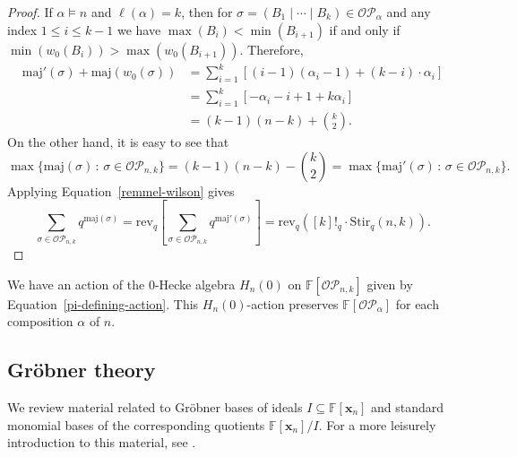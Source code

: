 \documentclass[ALCO,ThmDefs,published]{cedram}
\newcommand{\xx}{{\mathbf {x}}}
\newcommand{\FF}{{\mathbb{F}}}
\theoremstyle{plain}
\newcommand{\maj}{{\mathrm {maj}}}
\newcommand{\Stir}{{\mathrm {Stir}}}
\newcommand{\rev}{{\mathrm {rev}}}
\newcommand{\OP}{{\mathcal{OP}}}
\newcommand{\FF}{{\mathbb{F}}}
\newcommand{\xx}{{\mathbf {x}}}
\newcommand{\pib}{\overline{\pi}}
\begin{document}
\begin{proof}
If $\alpha \models n$ and $\ell(\alpha) = k$, then for $\sigma = (B_1 \mid \cdots \mid B_k) \in \OP_{\alpha}$
and any index $1 \leq i \leq k-1$ 
we have $\max(B_i) < \min(B_{i+1})$ if and only if $\min(w_0(B_i)) > \max(w_0(B_{i+1}))$.
Therefore,
\begin{align}
\maj'(\sigma) + \maj(w_0(\sigma)) &=  \sum_{i = 1}^{k} [(i-1)(\alpha_i - 1) + (k-i) \cdot \alpha_i] \\
&=  \sum_{i = 1}^{k} [-\alpha_i - i + 1 + k \alpha_i] \\
&= (k-1)(n - k) + {k \choose 2}.
\end{align}
On the other hand, it is easy to see that 
\begin{equation*}
\max\{ \maj(\sigma) \,:\, \sigma \in \OP_{n,k} \} = (k-1)(n - k) - {k \choose 2} =
\max\{ \maj'(\sigma) \,:\, \sigma \in \OP_{n,k} \}.
\end{equation*}
Applying Equation~\eqref{remmel-wilson} gives
\begin{equation}
\sum_{\sigma \in \OP_{n,k}} q^{\maj(\sigma)} = \rev_q \left[ \sum_{\sigma \in \OP_{n,k}} q^{\maj'(\sigma)} \right]
= \rev_q( [k]!_q \cdot \Stir_q(n,k) ).
\end{equation}
\end{proof}




We have an action of the $0$-Hecke algebra $H_n(0)$ on $\FF[\OP_{n,k}]$ given
by Equation~\eqref{pi-defining-action}.
This $H_n(0)$-action preserves $\FF[\OP_\alpha]$ for each composition $\alpha$ of $n$.




\subsection{Gr\"obner theory}
We review material related to Gr\"obner bases of ideals $I \subseteq \FF[\xx_n]$ and standard monomial
bases of the corresponding quotients $\FF[\xx_n]/I$.  For a more leisurely introduction to this material,
see \cite{CLO}.
\end{document}
